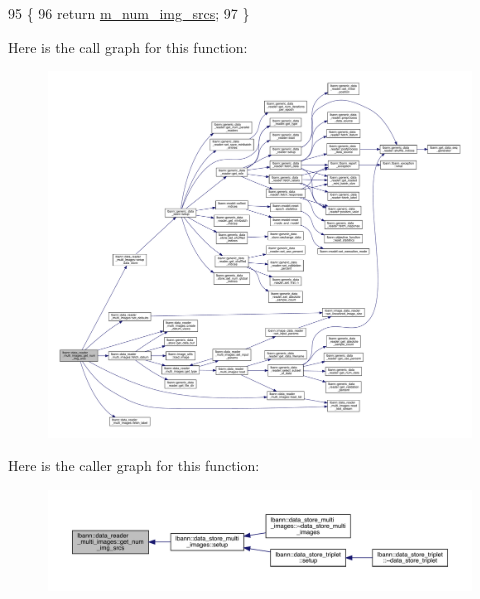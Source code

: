 \begin{DoxyCode}
95                                         \{
96     \textcolor{keywordflow}{return} \hyperlink{classlbann_1_1data__reader__multi__images_a70752a5442e99333fec52def9eadc58f}{m\_num\_img\_srcs};
97   \}
\end{DoxyCode}
Here is the call graph for this function\+:\nopagebreak
\begin{figure}[H]
\begin{center}
\leavevmode
\includegraphics[width=350pt]{classlbann_1_1data__reader__multi__images_a692a657d00afc38dde1dabeb66b1550f_cgraph}
\end{center}
\end{figure}
Here is the caller graph for this function\+:\nopagebreak
\begin{figure}[H]
\begin{center}
\leavevmode
\includegraphics[width=350pt]{classlbann_1_1data__reader__multi__images_a692a657d00afc38dde1dabeb66b1550f_icgraph}
\end{center}
\end{figure}
\mbox{\label{classlbann_1_1data__reader__multi__images_ab940ea9e62d5fac6d6c1b209404abe83}} 
